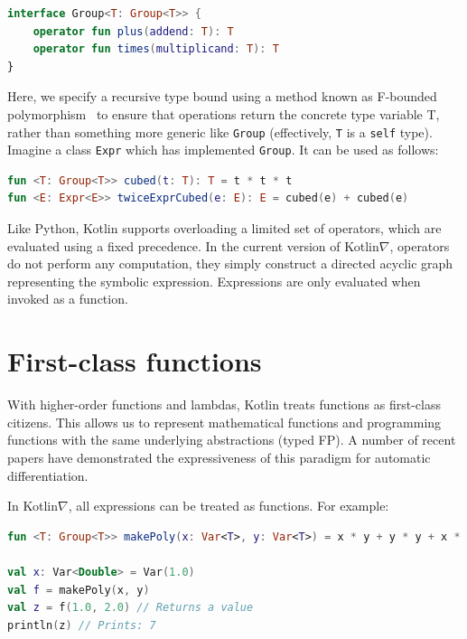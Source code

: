 \documentclass[12pt,initial,twoside,maitrise]{dms}
\numberwithin{equation}{section}
\numberwithin{table}{chapter}
\numberwithin{figure}{chapter}
\begin{document}
\begin{lstlisting}[caption={Simple code listing.}, language=Kotlin]
interface Group<T: Group<T>> {
    operator fun plus(addend: T): T
    operator fun times(multiplicand: T): T
}
\end{lstlisting}

Here, we specify a recursive type bound using a method known as F-bounded polymorphism~\cite{canning1989f} to ensure that operations return the concrete type variable T, rather than something more generic like \texttt{Group} (effectively, \texttt{T} is a \texttt{self} type). Imagine a class \texttt{Expr} which has implemented \texttt{Group}. It can be used as follows:

\begin{lstlisting}[caption={Simple code listing.}, language=Kotlin]
fun <T: Group<T>> cubed(t: T): T = t * t * t
fun <E: Expr<E>> twiceExprCubed(e: E): E = cubed(e) + cubed(e)
\end{lstlisting}

Like Python, Kotlin supports overloading a limited set of operators, which are evaluated using a fixed precedence. In the current version of Kotlin$\nabla$, operators do not perform any computation, they simply construct a directed acyclic graph representing the symbolic expression. Expressions are only evaluated when invoked as a function.

\section{First-class functions}\label{sec:first-class-functions}

With higher-order functions and lambdas, Kotlin treats functions as first-class citizens. This allows us to represent mathematical functions and programming functions with the same underlying abstractions (typed FP). A number of recent papers have demonstrated the expressiveness of this paradigm for automatic differentiation.

In Kotlin$\nabla$, all expressions can be treated as functions. For example:

\begin{lstlisting}[caption={Simple code listing.}, language=Kotlin]
fun <T: Group<T>> makePoly(x: Var<T>, y: Var<T>) = x * y + y * y + x * x

val x: Var<Double> = Var(1.0)
val f = makePoly(x, y)
val z = f(1.0, 2.0) // Returns a value
println(z) // Prints: 7
\end{lstlisting}
\end{document}
